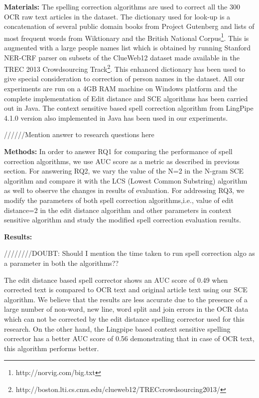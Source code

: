 \documentclass[preprint,11pt]{elsarticle}
\begin{document}
\noindent \textbf{Materials: }The spelling correction algorithms are used to correct all the 300 OCR raw text articles in the dataset. The dictionary used for look-up is a concatenation of several public domain books from Project Gutenberg and lists of most frequent words from Wiktionary and the British National Corpus\footnote{http://norvig.com/big.txt}. This is augmented with a large people names list which is obtained  by running Stanford NER-CRF parser on subsets of the ClueWeb12 dataset made available in the TREC 2013 Crowdsourcing Track\footnote{http://boston.lti.cs.cmu.edu/clueweb12/TRECcrowdsourcing2013/}. This enhanced dictionary has been used to give special consideration to correction of person names in the dataset.
All our experiments are run on a 4GB RAM machine on Windows platform and the complete implementation of Edit distance and SCE algorithms has been carried out in Java. The context sensitive based spell correction algorithm from LingPipe 4.1.0 version also implemented in Java has been used in our experiments. 


//////Mention answer to research questions here

\noindent \textbf{Methods: }In order to answer RQ1 for comparing the performance of spell correction algorithms, we use AUC score as a metric as described in previous section. For answering RQ2, we vary the value of the N=2 in the N-gram SCE algorithm and compare it with the LCS (Lowest Common Substring) algorithm as well to observe the changes in results of evaluation.
For addressing RQ3, we modify the parameters of both spell correction algorithms,i.e., value of edit distance=2 in the edit distance algorithm and other parameters in context sensitive algorithm and study the modified spell correction evaluation results.
 

\noindent \textbf{Results: }

////////DOUBT: Should I mention the time taken to run spell correction algo as a parameter in both the algorithms?? 

The edit distance based spell corrector shows an AUC score of 0.49 when corrected text is compared to OCR text and original article text using our SCE algorithm. We believe that the results are less accurate due to the presence of a large number of non-word, new line, word split and join errors in the OCR data which can not be corrected by the edit distance spelling corrector used for this research. 
On the other hand, the Lingpipe based context sensitive spelling corrector has a better AUC score of 0.56 demonstrating that in case of OCR text, this algorithm performs better.
\end{document}
